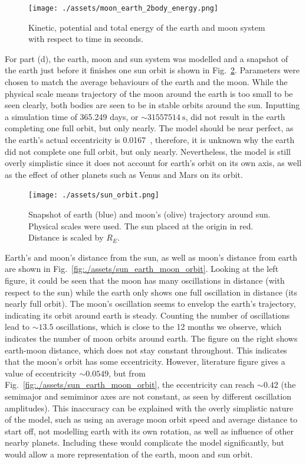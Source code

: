 \documentclass[hyphens,twocolumn,nobalancelastpage,aps,10pt,citeautoscript,longbibliography]{revtex4-2}
\begin{document}
\begin{figure}[htpb]
	\centering
	\texttt{[image: ./assets/moon\_earth\_2body\_energy.png]}
	\caption{Kinetic, potential and total energy of the earth and moon system
	with respect to time in seconds.}%
	\label{fig:./assets/moon_earth_2body_energy}
\end{figure}

For part (d), the earth, moon and sun system was modelled and a snapshot of the
earth just before it finishes one sun orbit is shown in
Fig.~\ref{fig:./assets/sun_orbit}. Parameters were chosen to match the average
behaviours of the earth and the moon. While the physical scale means trajectory
of the moon around the earth is too small to be seen clearly, both bodies are
seen to be in stable orbits around the sun. Inputting a simulation time of
365.249 days, or $\sim\qty{31557514}{\second}$, did not result in the earth
completing one full orbit, but only nearly. The model should be near perfect,
as the earth's actual eccentricity is 0.0167~\cite{eo}, therefore, it is
unknown why the earth did not complete one full orbit, but only nearly.
Nevertheless, the model is still overly simplistic since it does not account
for earth's orbit on its own axis, as well as the effect of other planets such
as Venus and Mars on its orbit.

\begin{figure}[htpb]
	\centering
	\texttt{[image: ./assets/sun\_orbit.png]}
	\caption{Snapshot of earth (blue) and moon's (olive) trajectory around sun.
	Physical scales were used. The sun placed at the origin in red. Distance is scaled by $R_E$.}%
	\label{fig:./assets/sun_orbit}
\end{figure}


Earth's and moon's distance from the sun, as well as moon's distance from earth
are shown in Fig.~\ref{fig:./assets/sun_earth_moon_orbit}. Looking at the left
figure, it could be seen that the moon has many oscillations in distance (with
respect to the sun) while the earth only shows one full oscillation in distance
(its nearly full orbit). The moon's oscillation seems to envelop the earth's
trajectory, indicating its orbit around earth is steady. Counting the number of
oscillations lead to $\sim 13.5$ oscillations, which is close to the 12 months
we observe, which indicates the number of moon orbits around earth. The figure
on the right shows earth-moon distance, which does not stay constant
throughout. This indicates that the moon's orbit has some eccentricity.
However, literature figure gives a value of eccentricity $\sim 0.0549$, but
from Fig.~\ref{fig:./assets/sun_earth_moon_orbit}, the eccentricity can reach
$\sim 0.42$ (the semimajor and semiminor axes are not constant, as seen by
different oscillation amplitudes). This inaccuracy can be explained with the
overly simplistic nature of the model, such as using an average moon orbit
speed and average distance to start off, not modelling earth with its own
rotation, as well as influence of other nearby planets. Including these would
complicate the model significantly, but would allow a more representation of
the earth, moon and sun orbit.
\end{document}
